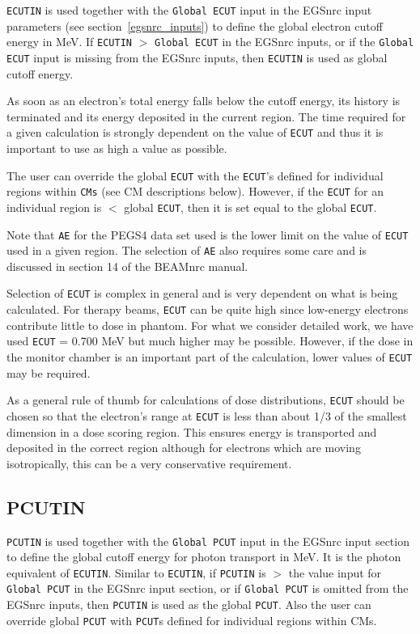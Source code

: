 \documentclass[12pt,twoside]{article}      %
\newcommand{\indexm}[1]{\index{#1}}
\begin{document}
\verb+ECUTIN+ is used together with the {\tt Global ECUT} input in the
EGSnrc input parameters (see section~\ref{egsnrc_inputs}) to define the
global electron cutoff energy in MeV.
If {\tt ECUTIN} $>$ {\tt Global ECUT}
in the EGSnrc inputs, or if the {\tt Global ECUT} input is missing from the
EGSnrc inputs, then {\tt ECUTIN} is used as global cutoff energy.

As soon as an electron's total energy falls below the cutoff energy, its
history is terminated and its energy deposited in the current region.
The time required for a given calculation is strongly dependent on the
value of \verb+ECUT+ and thus it is important to use as high a value
as possible.

The user can override
the global \verb+ECUT+ with the \verb+ECUT+'s defined for individual regions within
\verb+CMs+ (see CM descriptions below).  However, if the \verb+ECUT+ for an
individual region is $<$ global \verb+ECUT+, then it is set equal to the
global \verb+ECUT+.

Note that \verb+AE+ for the PEGS4 data set used is the lower limit on
the value of \verb+ECUT+ used in a given region.  The selection of
\verb+AE+ also requires some care and is discussed in section 14 of
the BEAMnrc manual.
 

Selection of \verb+ECUT+ is complex in general and is very dependent on
what is being calculated\cite{Ro84,RB90}.  For therapy beams,
\verb+ECUT+ can be quite high since low-energy electrons contribute
little to dose in phantom.  For what we consider detailed work, we have
used \verb+ECUT+ = 0.700 MeV but much higher may be possible.  However,
if the dose in the monitor chamber is an important part of the
calculation, lower values of \verb+ECUT+ may be required.

As a general rule of thumb for calculations of dose distributions,
\verb+ECUT+ should be chosen so that the electron's range at \verb+ECUT+
is less than about 1/3 of the smallest dimension in a dose scoring region.
This ensures energy is transported and deposited in the correct region
although for electrons which are moving isotropically, this can be a
very conservative requirement.

\subsection{PCUTIN}
\indexm{PCUTIN}
\label{PCUTIN}
\indexm{PCUT}

\verb+PCUTIN+ is used together with the {\tt Global PCUT} input in the EGSnrc
input section to define the global cutoff energy for photon transport in
MeV.  It is the photon equivalent of \verb+ECUTIN+.  Similar to {\tt ECUTIN},
if {\tt PCUTIN} is $>$ the value input for {\tt Global PCUT} in the EGSnrc
input section, or if {\tt Global PCUT} is omitted from the EGSnrc inputs, then
{\tt PCUTIN} is used as the global {\tt PCUT}.  Also
the user can override global \verb+PCUT+ with \verb+PCUT+s defined for
individual regions within CMs.
\end{document}

